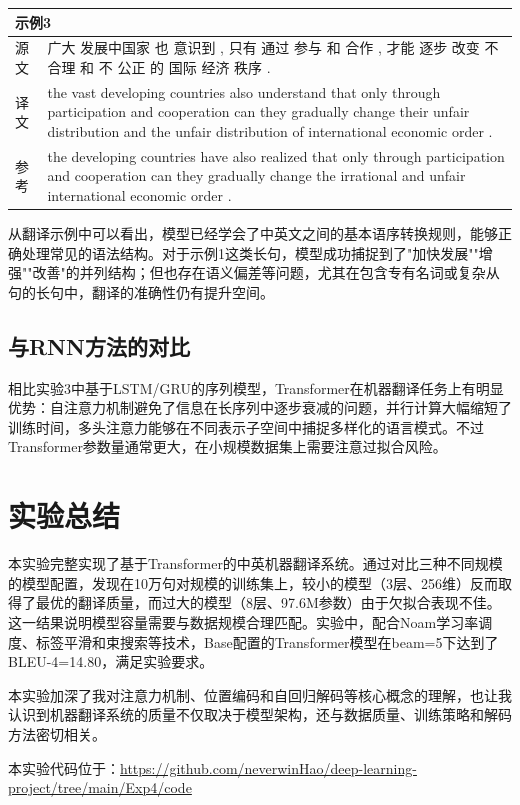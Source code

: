\documentclass[12pt,a4paper]{article}
\begin{document}
\begin{longtable}{p{}p{}}
    \midrule
    \multicolumn{2}{l}{\textbf{示例3}} \\
    \midrule
    源文 & 广大 发展中国家 也 意识到 , 只有 通过 参与 和 合作 , 才能 逐步 改变 不合理 和 不 公正 的 国际 经济 秩序 . \\
    译文 & the vast developing countries also understand that only through participation and cooperation can they gradually change their unfair distribution and the unfair distribution of international economic order . \\
    参考 & the developing countries have also realized that only through participation and cooperation can they gradually change the irrational and unfair international economic order . \\
\end{longtable}

从翻译示例中可以看出，模型已经学会了中英文之间的基本语序转换规则，能够正确处理常见的语法结构。对于示例1这类长句，模型成功捕捉到了"加快发展""增强""改善"的并列结构；但也存在语义偏差等问题，尤其在包含专有名词或复杂从句的长句中，翻译的准确性仍有提升空间。

\subsection{与RNN方法的对比}

相比实验3中基于LSTM/GRU的序列模型，Transformer在机器翻译任务上有明显优势：自注意力机制避免了信息在长序列中逐步衰减的问题，并行计算大幅缩短了训练时间，多头注意力能够在不同表示子空间中捕捉多样化的语言模式。不过Transformer参数量通常更大，在小规模数据集上需要注意过拟合风险。

\section{实验总结}

本实验完整实现了基于Transformer的中英机器翻译系统。通过对比三种不同规模的模型配置，发现在10万句对规模的训练集上，较小的模型（3层、256维）反而取得了最优的翻译质量，而过大的模型（8层、97.6M参数）由于欠拟合表现不佳。这一结果说明模型容量需要与数据规模合理匹配。实验中，配合Noam学习率调度、标签平滑和束搜索等技术，Base配置的Transformer模型在beam=5下达到了BLEU-4=14.80，满足实验要求。

本实验加深了我对注意力机制、位置编码和自回归解码等核心概念的理解，也让我认识到机器翻译系统的质量不仅取决于模型架构，还与数据质量、训练策略和解码方法密切相关。

本实验代码位于：\url{https://github.com/neverwinHao/deep-learning-project/tree/main/Exp4/code}
\end{document}
